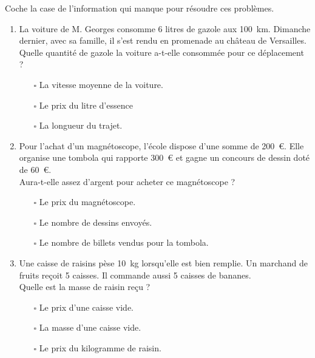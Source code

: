 \par Coche la case de l'information qui manque pour résoudre ces problèmes.
\begin{enumerate}[A/]
\item La voiture de M. Georges consomme 6 litres de gazole aux 100~km. Dimanche dernier, avec sa famille, il s'est rendu en promenade au château de Versailles. \\Quelle quantité de gazole la voiture a-t-elle consommée pour ce déplacement ?
{\em
\begin{itemize}
\item[$\square$] La vitesse moyenne de la voiture.
\item[$\square$] Le prix du litre d'essence
\item[$\square$] La longueur du trajet.
\end{itemize}
}
\item Pour l'achat d'un magnétoscope, l'école dispose d'une somme de 
200~\textgreek{\euro}. Elle organise une tombola qui rapporte 
300~\textgreek{\euro} et gagne un concours de dessin doté de 
60~\textgreek{\euro}.\\Aura-t-elle assez d'argent pour acheter ce 
magnétoscope ?
{\em
\begin{itemize}
\item[$\square$] Le prix du magnétoscope.
\item[$\square$] Le nombre de dessins envoyés.
\item[$\square$] Le nombre de billets vendus pour la tombola.
\end{itemize}
}
\item Une caisse de raisins pèse 10~kg lorsqu'elle est bien remplie. Un 
marchand de fruits reçoit 5 caisses. Il commande aussi 5 caisses de 
bananes.\\Quelle est la masse de raisin reçu ?
{\em
\begin{itemize}
\item[$\square$] Le prix d'une caisse vide.
\item[$\square$] La masse d'une caisse vide.
\item[$\square$] Le prix du kilogramme de raisin.
\end{itemize}
}
\end{enumerate}
